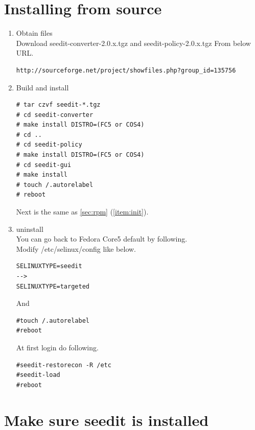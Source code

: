 \documentclass{article}
\begin{document}
\section{Installing from source}
\begin{enumerate}
 \item Obtain files\\
Download seedit-converter-2.0.x.tgz and seedit-policy-2.0.x.tgz
From below URL.
\begin{verbatim}
http://sourceforge.net/project/showfiles.php?group_id=135756	
\end{verbatim}
 \item Build and install\\
\begin{verbatim}
# tar czvf seedit-*.tgz
# cd seedit-converter
# make install DISTRO=(FC5 or COS4)
# cd .. 
# cd seedit-policy
# make install DISTRO=(FC5 or COS4)
# cd seedit-gui
# make install
# touch /.autorelabel
# reboot
\end{verbatim}
Next is the same as \ref{sec:rpm} (\ref{item:init}).\\
 \item uninstall\\
You can go back to Fedora Core5 default by following.\\
Modify /etc/selinux/config like below.
\begin{verbatim}
SELINUXTYPE=seedit
-->
SELINUXTYPE=targeted
\end{verbatim}
And 
\begin{verbatim}
#touch /.autorelabel
#reboot	
\end{verbatim}

At first login do following.
\begin{verbatim}
#seedit-restorecon -R /etc
#seedit-load 
#reboot	
\end{verbatim}

\end{enumerate}



\section{Make sure seedit is installed}\label{sec:makesure}
\end{document}
